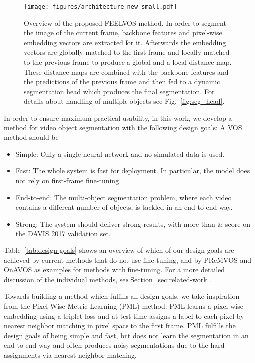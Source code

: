 \documentclass[10pt,twocolumn,letterpaper]{article}
\newcommand{\PAR}[1]{\vskip1pt \noindent {\bf #1~}}
\begin{document}
\begin{figure*}[t]
\centering
\texttt{[image: figures/architecture\_new\_small.pdf]}
\caption{\label{fig:method_overview}Overview of the proposed FEELVOS method. In order to segment the image of the current frame, backbone features and pixel-wise embedding vectors are extracted for it. Afterwards the embedding vectors are globally matched to the first frame and locally matched to the previous frame to produce a global and a local distance map. These distance maps are combined with the backbone features and the predictions of the previous frame and then fed to a dynamic segmentation head which produces the final segmentation. For details about handling of multiple objects see Fig.~\ref{fig:seg_head}.
}
\end{figure*}

\PAR{Design Goals.} In order to ensure maximum practical usability, in this work, we develop a method for video object segmentation with the following design goals: A VOS method should be
\begin{itemize}
\vspace{-5pt}
\setlength\itemsep{-0.4em}
\item{Simple: Only a single neural network and no simulated data is used.}
\item{Fast: The whole system is fast for deployment. In particular, the model does not rely on first-frame fine-tuning.}
\item{End-to-end: The multi-object segmentation problem, where each video contains a different number of objects, is tackled in an end-to-end way.}
\item{Strong: The system should deliver strong results, with more than  \& score on the DAVIS 2017 validation set.}
\end{itemize}
Table~\ref{tab:design-goals} shows an overview of which of our design goals are achieved by current methods that do not use fine-tuning, and by PReMVOS \cite{Luiten18ACCV, Luiten18DAVIS, Luiten18ECCVW} and OnAVOS \cite{voigtlaender17BMVC} as examples for methods with fine-tuning. For a more detailed discussion of the individual methods, see Section~\ref{sec:related-work}.

Towards building a method which fulfills all design goals, we take inspiration from the Pixel-Wise Metric Learning (PML) \cite{Chen18CVPR} method. PML learns a pixel-wise embedding using a triplet loss and at test time assigns a label to each pixel by nearest neighbor matching in pixel space to the first frame. PML fulfills the design goals of being simple and fast, but does not learn the segmentation in an end-to-end way and often produces noisy segmentations due to the hard assignments via nearest neighbor matching.
\end{document}
